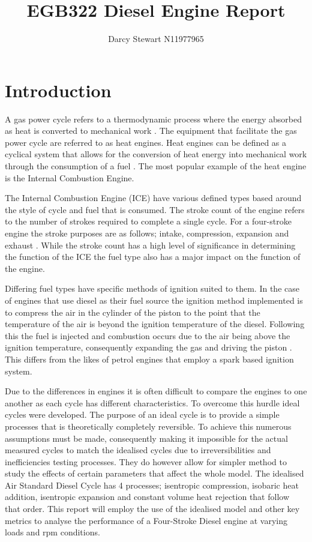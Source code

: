 \documentclass[12pt]{article}
\begin{document}
\author{Darcy Stewart N11977965}
\title{EGB322 Diesel Engine Report}
\maketitle
\pagebreak
\tableofcontents
\pagebreak
\section{Introduction}
A gas power cycle refers to a thermodynamic process where the energy absorbed as heat is converted to mechanical work \cite{Dincer}. The equipment that facilitate the gas power cycle are referred to as heat engines. Heat engines can be defined as a cyclical system that allows for the conversion of heat energy into mechanical work through the consumption of a fuel \cite{Basu}. The most popular example of the heat engine is the Internal Combustion Engine.
\par
The Internal Combustion Engine (ICE) have various defined types based around the style of cycle and fuel that is consumed. The stroke count of the engine refers to the number of strokes required to complete a single cycle. For a four-stroke engine the stroke purposes are as follows; intake, compression, expansion and exhaust \cite{Proctor}. While the stroke count has a high level of significance in determining the function of the ICE the fuel type also has a major impact on the function of the engine.
\par
Differing fuel types have specific methods of ignition suited to them. In the case of engines that use diesel as their fuel source the ignition method implemented is to compress the air in the cylinder of the piston to the point that the temperature of the air is beyond the ignition temperature of the diesel. Following this the fuel is injected and combustion occurs due to the air being above the ignition temperature, consequently expanding the gas and driving the piston \cite{Sun}. This differs from the likes of petrol engines that employ a spark based ignition system.
\par
Due to the differences in engines it is often difficult to compare the engines to one another as each cycle has different characteristics. To overcome this hurdle ideal cycles were developed. The purpose of an ideal cycle is to provide a simple processes that is theoretically completely reversible. To achieve this numerous assumptions must be made, consequently making it impossible for the actual measured cycles to match the idealised cycles due to irreversibilities and inefficiencies testing processes. They do however allow for simpler method to study the effects of certain parameters that affect the whole model. The idealised Air Standard Diesel Cycle has 4 processes; isentropic compression, isobaric heat addition, isentropic expansion and constant volume heat rejection that follow that order\cite{Proctor}. This report will employ the use of the idealised model and other key metrics to analyse the performance of a Four-Stroke Diesel engine at varying loads and rpm conditions.
\end{document}
